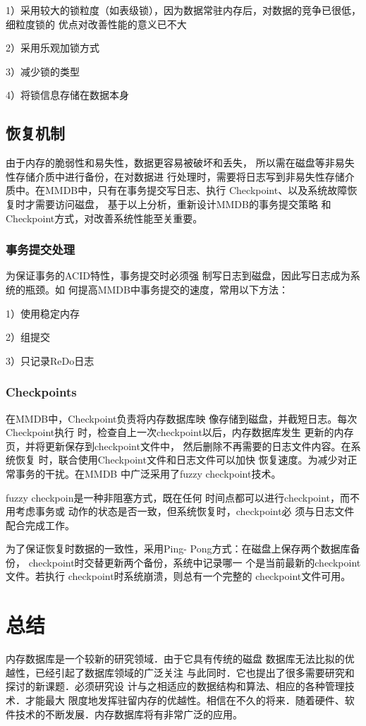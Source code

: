 \documentclass[literaturereview]{zjutreport}
\begin{document}
1）采用较大的锁粒度（如表级锁），因为数据常驻内存后，对数据的竞争已很低，细粒度锁的
优点对改善性能的意义已不大

2）采用乐观加锁方式

3）减少锁的类型

4）将锁信息存储在数据本身

\section{恢复机制}
由于内存的脆弱性和易失性，数据更容易被破坏和丢失，
所以需在磁盘等非易失性存储介质中进行备份，在对数据进
行处理时，需要将日志写到非易失性存储介质中。在MMDB中，只有在事务提交写日志、执行
Checkpoint、以及系统故障恢复时才需要访问磁盘，
基于以上分析，重新设计MMDB的事务提交策略
和Checkpoint方式，对改善系统性能至关重要。

\subsection{事务提交处理}
为保证事务的ACID特性，事务提交时必须强
制写日志到磁盘，因此写日志成为系统的瓶颈。如
何提高MMDB中事务提交的速度，常用以下方法：

1）使用稳定内存

2）组提交

3）只记录ReDo日志

\subsection{Checkpoints}
在MMDB中，Checkpoint负责将内存数据库映
像存储到磁盘，并截短日志。每次Checkpoint执行
时，检查自上一次checkpoint以后，内存数据库发生
更新的内存页，并将更新保存到checkpoint文件中，
然后删除不再需要的日志文件内容。在系统恢复
时，联合使用Checkpoint文件和日志文件可以加快
恢复速度。为减少对正常事务的干扰。在MMDB
中广泛采用了fuzzy checkpoint技术。

fuzzy checkpoin是一种非阻塞方式，既在任何
时间点都可以进行checkpoint，而不用考虑事务或
动作的状态是否一致，但系统恢复时，checkpoint必
须与日志文件配合完成工作。

为了保证恢复时数据的一致性，采用Ping-
Pong方式：在磁盘上保存两个数据库备份，
checkpoint时交替更新两个备份，系统中记录哪一
个是当前最新的checkpoint文件。若执行
checkpoint时系统崩溃，则总有一个完整的
checkpoint文件可用。

\chapter{总结}
内存数据库是一个较新的研究领域．由于它具有传统的磁盘
数据库无法比拟的优越性，已经引起了数据库领域的广泛关注
与此同时．它也提出了很多需要研究和探讨的新课题．必须研究设
计与之相适应的数据结构和算法、相应的各种管理技术．才能最大
限度地发挥驻留内存的优越性。相信在不久的将来．随着硬件、软
件技术的不断发展．内存数据库将有非常广泛的应用。
\end{document}
